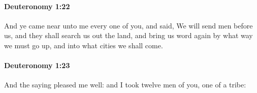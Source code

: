 		\paragraph{Deuteronomy 1:22} %
			\label{DEUTERONOMY-1-22}

			And ye came near unto me every one of you, and said, We will send men before us, and they shall search us out the land, and bring us word again by what way we must go up, and into what cities we shall come.


		\paragraph{Deuteronomy 1:23} %
			\label{DEUTERONOMY-1-23}

			And the saying pleased me well: and I took twelve men of you, one of a tribe:


